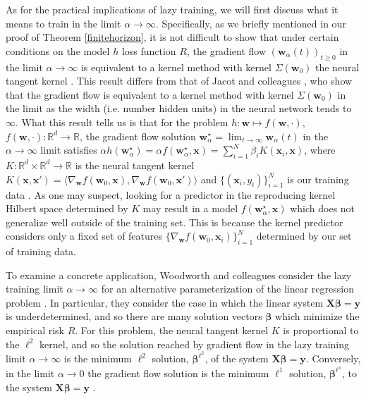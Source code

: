 \documentclass{article}
\begin{document}
As for the practical implications of lazy training, we will first discuss what it means to train in the limit $\alpha \rightarrow \infty$. Specifically, as we briefly mentioned in our proof of Theorem \ref{finitehorizon}, it is not difficult to show that under certain conditions on the model $h$ loss function $R$, the gradient flow $(\boldsymbol{w}_{\alpha}(t))_{t \geq 0}$ in the limit $\alpha \rightarrow \infty$ is equivalent to a kernel method with kernel $\Sigma(\boldsymbol{w}_0)$ the neural tangent kernel \cite{chizat2018note}. This result differs from that of Jacot and colleagues \cite{jacot2018neural}, who show that the gradient flow is equivalent to a kernel method with kernel $\Sigma(\boldsymbol{w}_0)$ in the limit as the width (i.e. number hidden units) in the neural network tends to $\infty$. What this result tells us is that for the problem $h: \boldsymbol{w} \mapsto f(\boldsymbol{w}, \cdot)$, $f(\boldsymbol{w}, \cdot): \mathbb{R}^d \rightarrow \mathbb{R}$, the gradient flow solution $\boldsymbol{w}_{\alpha}^{\star} = \lim_{t \to \infty} \boldsymbol{w}_{\alpha}(t)$ in the $\alpha \rightarrow \infty$ limit satisfies $\alpha h(\boldsymbol{w}_{\alpha}^{\star}) = \alpha f(\boldsymbol{w}_{\alpha}^{\star}, \boldsymbol{x}) = \sum_{i=1}^N \beta_i K(\boldsymbol{x}_i, \boldsymbol{x})$, where $K: \mathbb{R}^d \times \mathbb{R}^d \rightarrow \mathbb{R}$ is the neural tangent kernel $K(\boldsymbol{x}, \boldsymbol{x}') = \langle \nabla_{\boldsymbol{w}} f(\boldsymbol{w}_0, \boldsymbol{x}), \nabla_{\boldsymbol{w}} f(\boldsymbol{w}_0, \boldsymbol{x}') \rangle$ and $\{ (\boldsymbol{x}_i, y_i) \}_{i=1}^N$ is our training data \cite{chizat2018note}. As one may suspect, looking for a predictor in the reproducing kernel Hilbert space determined by $K$ may result in a model $f(\boldsymbol{w}_{\alpha}^{\star}, \boldsymbol{x})$ which does not generalize well outside of the training set. This is because the kernel predictor considers only a fixed set of features $\{ \nabla_{\boldsymbol{w}} f(\boldsymbol{w}_0, \boldsymbol{x}_i) \}_{i=1}^N$ determined by our set of training data.

To examine a concrete application, Woodworth and colleagues consider the lazy training limit $\alpha \rightarrow \infty$ for an alternative parameterization of the linear regression problem \cite{woodworth2020kernel}. In particular, they consider the case in which the linear system $\boldsymbol{X}\boldsymbol{\beta} = \boldsymbol{y}$ is underdetermined, and so there are many solution vectors $\boldsymbol{\beta}$ which minimize the empirical risk $R$. For this problem, the neural tangent kernel $K$ is proportional to the $\ell^2$ kernel, and so the solution reached by gradient flow in the lazy training limit $\alpha \rightarrow \infty$ is the minimum $\ell^2$ solution, $\boldsymbol{\beta}^{\ell^2}$, of the system $\boldsymbol{X}\boldsymbol{\beta} = \boldsymbol{y}$. Conversely, in the limit $\alpha \rightarrow 0$ the gradient flow solution is the minimum $\ell^1$ solution, $\boldsymbol{\beta}^{\ell^1}$, to the system $\boldsymbol{X}\boldsymbol{\beta} = \boldsymbol{y}$ \cite{woodworth2020kernel}. 
\end{document}
